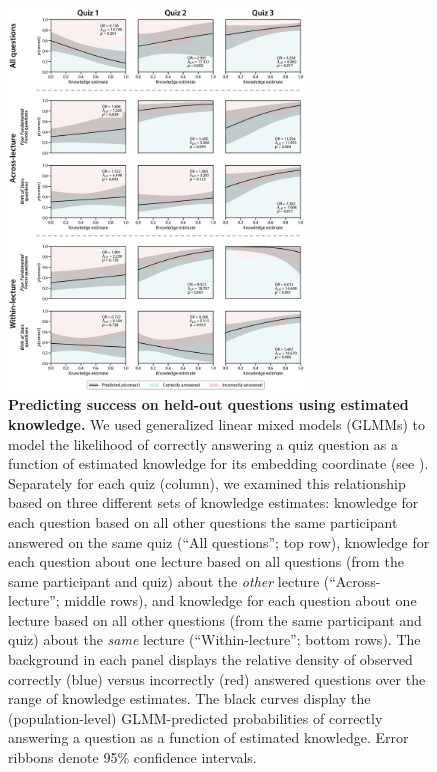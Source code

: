 \documentclass[10pt]{article}
\renewcommand{\nameref}[1]{\mbox{\textit{\oldnameref{#1}}}}
\begin{document}
\begin{figure}[tp]
    \centering
    \includegraphics[width=0.7\textwidth]{figs/predict-knowledge-questions}
    \caption{\textbf{Predicting success on held-out questions using estimated knowledge.}
    We used generalized linear mixed models (GLMMs) to model the likelihood of correctly answering a quiz question as a function of estimated knowledge for its embedding coordinate (see \nameref{subsec:glmm}). 
    Separately for each quiz (column), we examined this relationship based on three different sets of knowledge estimates: knowledge for each question based on all other questions the same participant answered on the same quiz (``All questions''; top row), knowledge for each question about one lecture based on all questions (from the same participant and quiz) about the \textit{other} lecture (``Across-lecture''; middle rows), and knowledge for each question about one lecture based on all other questions (from the same participant and quiz) about the \textit{same} lecture (``Within-lecture''; bottom rows). 
    The background in each panel displays the relative density of observed correctly (blue) versus incorrectly (red) answered questions over the range of knowledge estimates. 
    The black curves display the (population-level) GLMM-predicted probabilities of correctly answering a question as a function of estimated knowledge. 
    Error ribbons denote 95\% confidence intervals.}

    \label{fig:predictions}
\end{figure}
\end{document}
